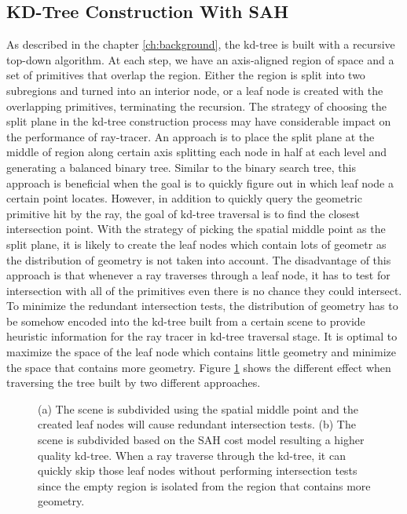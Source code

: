 \subsection{KD-Tree Construction With SAH} 
As described in the chapter \ref{ch:background}, the kd-tree is built with a recursive top-down algorithm. At each step, we have an axis-aligned region of space and a set of primitives that overlap the region. Either the region is split into two subregions and turned into an interior node, or a leaf node is created with the overlapping primitives, terminating the recursion.  
The strategy of choosing the split plane in the kd-tree construction process may have considerable impact on the performance of ray-tracer. An \mynaive approach is to place the split plane at the middle of region along certain axis splitting each node in half at each level and generating a balanced binary tree. Similar to the binary search tree, this approach is beneficial when the goal is to quickly figure out in which leaf node a certain point locates. However, in addition to quickly query the geometric primitive hit by the ray, the goal of kd-tree traversal is to find the closest intersection point. With the strategy of picking the spatial middle point as the split plane, it is likely to create the leaf nodes which contain lots of geometr as the distribution of geometry is not taken into account. The disadvantage of this approach is that whenever a ray traverses through a leaf node, it has to test for intersection with all of the primitives even there is no chance they could intersect. To minimize the redundant intersection tests, the distribution of geometry has to be somehow encoded into the kd-tree built from a certain scene to provide heuristic information for the ray tracer in kd-tree traversal stage. It is optimal to maximize the space of the leaf node which contains little geometry and minimize the space that contains more geometry. Figure \ref{fig:kd-tree_subdivide_spatial_mid_vs_sah} shows the different effect when traversing the tree built by two different approaches. 

\begin{figure}[htp] 
    \centering 
    \renewcommand{\thefigure}{\thechapter.\arabic{figure}}
    \caption[Spatial median split and SAH-based split]{(a) The scene is subdivided using the spatial middle point and the created leaf nodes will cause redundant intersection tests. (b) The scene is subdivided based on the SAH cost model resulting a higher quality kd-tree. When a ray traverse through the kd-tree, it can quickly skip those leaf nodes without performing intersection tests since the empty region is isolated from the region that contains more geometry.}
    \label{fig:kd-tree_subdivide_spatial_mid_vs_sah}
\end{figure}

